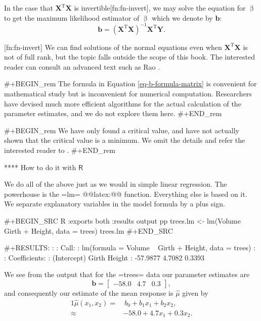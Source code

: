 In the case that \(\mathbf{X}^{\mathrm{T}}\mathbf{X}\) is
invertible[fn:fn-invert], we may solve the equation for \(\upbeta\) to
get the maximum likelihood estimator of \(\upbeta\) which we denote by
\(\mathbf{b}\):
\begin{equation}
\label{eq-b-formula-matrix}
\mathbf{b}=\left(\mathbf{X}^{\mathrm{T}}\mathbf{X}\right)^{-1}\mathbf{X}^{\mathrm{T}}\mathbf{Y}.
\end{equation}

[fn:fn-invert] We can find solutions of the normal equations even when
\(\mathbf{X}^{\mathrm{T}}\mathbf{X}\) is not of full rank, but the
topic falls outside the scope of this book. The interested reader can
consult an advanced text such as Rao \cite{Rao1999}.

#+BEGIN_rem
The formula in Equation \eqref{eq-b-formula-matrix} is convenient for
mathematical study but is inconvenient for numerical
computation. Researchers have devised much more efficient algorithms
for the actual calculation of the parameter estimates, and we do not
explore them here.
#+END_rem

#+BEGIN_rem
We have only found a critical value, and have not actually shown that
the critical value is a minimum. We omit the details and refer the
interested reader to \cite{Rao1999}.
#+END_rem

**** How to do it with \(\mathsf{R}\)

We do all of the above just as we would in simple linear
regression. The powerhouse is the =lm= @@latex:@@
function. Everything else is based on it. We separate explanatory
variables in the model formula by a plus sign.

#+BEGIN_SRC R :exports both :results output pp 
trees.lm <- lm(Volume ~ Girth + Height, data = trees)
trees.lm
#+END_SRC

#+RESULTS:
: 
: Call:
: lm(formula = Volume ~ Girth + Height, data = trees)
: 
: Coefficients:
: (Intercept)        Girth       Height  
:    -57.9877       4.7082       0.3393

We see from the output that for the =trees= data our parameter
estimates are \[ \mathbf{b}=\begin{bmatrix}-58.0 & 4.7 &
0.3\end{bmatrix}, \] and consequently our estimate of the mean
response is \(\hat{\mu}\) given by
\begin{alignat}{1} 
\hat{\mu}(x_{1},x_{2}) = & \ b_{0} + b_{1} x_{1} + b_{2}x_{2},\\ \approx & -58.0 + 4.7 x_{1} + 0.3 x_{2}.
\end{alignat} 

